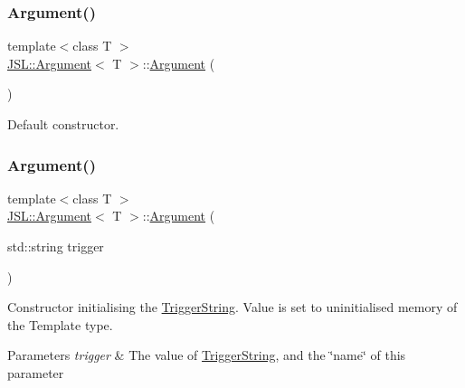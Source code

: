 \subsubsection{\texorpdfstring{Argument()}{Argument()}\hspace{0.1cm}{\footnotesize\ttfamily [1/5]}}
{\footnotesize\ttfamily template$<$class T $>$ \\
\hyperlink{classJSL_1_1Argument}{J\+S\+L\+::\+Argument}$<$ T $>$\+::\hyperlink{classJSL_1_1Argument}{Argument} (\begin{DoxyParamCaption}{ }\end{DoxyParamCaption})\hspace{0.3cm}{\ttfamily [inline]}}



Default constructor. 

\mbox{\label{classJSL_1_1Argument_ab07e7981db832cce30f534c67f6491f4}} 
\subsubsection{\texorpdfstring{Argument()}{Argument()}\hspace{0.1cm}{\footnotesize\ttfamily [2/5]}}
{\footnotesize\ttfamily template$<$class T $>$ \\
\hyperlink{classJSL_1_1Argument}{J\+S\+L\+::\+Argument}$<$ T $>$\+::\hyperlink{classJSL_1_1Argument}{Argument} (\begin{DoxyParamCaption}\item[{std\+::string}]{trigger }\end{DoxyParamCaption})\hspace{0.3cm}{\ttfamily [inline]}}



Constructor initialising the \hyperlink{classJSL_1_1ArgumentInterface_afa2d1f96c4971070d3de5824f297312f}{Trigger\+String}. Value is set to uninitialised memory of the Template type. 


\begin{DoxyParams}{Parameters}
{\em trigger} & The value of \hyperlink{classJSL_1_1ArgumentInterface_afa2d1f96c4971070d3de5824f297312f}{Trigger\+String}, and the \char`\"{}name\char`\"{} of this parameter \\
\hline
\end{DoxyParams}
\mbox{\label{classJSL_1_1Argument_a2511f7c98ee2b0b59650f468341b8747}} 
